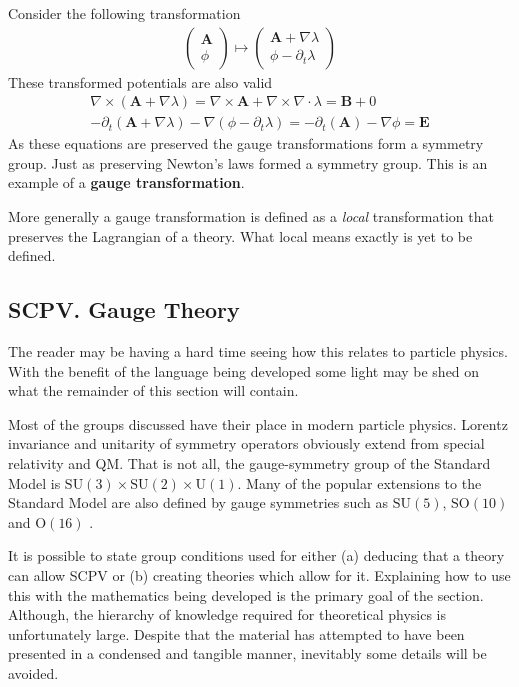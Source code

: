 Consider the following transformation
\begin{align*}
\left( \begin{array}{l}
\mathbf{A} \\ \phi
\end{array} \right) \mapsto
\left( \begin{array}{l}
\mathbf{A}+\nabla \lambda \\
\phi - \partial_t \lambda
\end{array} \right)
\end{align*}
These transformed potentials are also valid
\begin{align*}
\nabla \times (\mathbf{A}+\nabla \lambda) = \nabla\times \mathbf{A} + \nabla \times \nabla \cdot \lambda  = \mathbf{B} + 0 \\
-\partial_t(\mathbf{A}+\nabla \lambda)-\nabla (\phi - \partial_t \lambda) = -\partial_t(\mathbf{A})-\nabla \phi = \mathbf{E}
\end{align*}
As these equations are preserved the gauge transformations form a symmetry group. Just as preserving Newton's laws formed a symmetry group. This is an example of a \textbf{gauge transformation}.

More generally a gauge transformation is defined as a \textit{local} transformation that preserves the Lagrangian of a theory. What local means exactly is yet to be defined.

\subsection{SCPV. Gauge Theory}

The reader may be having a hard time seeing how this relates to particle physics. With the benefit of the language being developed some light may be shed on what the remainder of this section will contain.

Most of the groups discussed have their place in modern particle physics. Lorentz invariance and unitarity of symmetry operators obviously extend from special relativity and QM. That is not all, the gauge-symmetry group of the Standard Model is $\mathrm{SU}(3)\times \mathrm{SU}(2)\times \mathrm{U}(1)$. Many of the popular extensions to the Standard Model are also defined by gauge symmetries such as $\mathrm{SU}(5)$, $\mathrm{SO}(10)$ and $\mathrm{O}(16)$ \cite{SCPV4}.

It is possible to state group conditions used for either (a) deducing that a theory can allow SCPV or (b) creating theories which allow for it\cite{SCPV5}. Explaining how to use this with the mathematics being developed is the primary goal of the section. Although, the hierarchy of knowledge required for theoretical physics is unfortunately large. Despite that the material has attempted to have been presented in a condensed and tangible manner, inevitably some details will be avoided.

